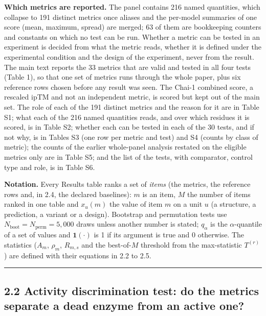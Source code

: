 \documentclass[
  10pt,
]{article}
\DeclareRobustCommand{\_}{\textunderscore\hspace{0pt}}
\begin{document}
\textbf{Which
metrics are
reported.} The panel
contains 216 named
quantities, which
collapse to 191
distinct metrics
once aliases and the
per-model summaries
of one score (mean,
maximum, spread) are
merged; 63 of them
are bookkeeping
counters and
constants on which
no test can be run.
Whether a metric can
be tested in an
experiment is
decided from what
the metric reads,
whether it is
defined under the
experimental
condition and the
design of the
experiment, never
from the result. The
main text reports
the 33 metrics that
are valid and tested
in all four tests
(Table 1), so that
one set of metrics
runs through the
whole paper, plus
six reference rows
chosen before any
result was seen. The
Chai-1 combined
score, a rescaled
ipTM and not an
independent metric,
is scored but kept
out of the main set.
The role of each of
the 191 distinct
metrics and the
reason for it are in
Table S1; what each
of the 216 named
quantities reads,
and over which
residues it is
scored, is in Table
S2; whether each can
be tested in each of
the 30 tests, and if
not why, is in
Tables S3 (one row
per metric and test)
and S4 (counts by
class of metric);
the counts of the
earlier whole-panel
analysis restated on
the eligible metrics
only are in Table
S5; and the list of
the tests, with
comparator, control
type and role, is in
Table S6.

\textbf{Notation.}
Every Results table
ranks a set of
\emph{items} (the
metrics, the
reference rows and,
in 2.4, the declared
baselines): \(m\) is
an item, \(M\) the
number of items
ranked in one table
and \(x_u(m)\) the
value of item \(m\)
on a unit \(u\) (a
structure, a
prediction, a
variant or a
design). Bootstrap
and permutation
tests use
\(N_{\mathrm{boot}} = N_{\mathrm{perm}} = 5{,}000\)
draws unless another
number is stated;
\(q_{\alpha}\) is
the
\(\alpha\)-quantile
of a set of values
and
\(\mathbf{1}(\cdot)\)
is 1 if its argument
is true and 0
otherwise. The
statistics (\(A_m\),
\(\rho_m\),
\(R_{m,s}\) and the
best-of-\(M\)
threshold from the
max-statistic
\(T^{(r)}\)) are
defined with their
equations in 2.2 to
2.5.

\begin{center}\rule{0.5\linewidth}{0.5pt}\end{center}

\subsection{2.2
Activity
discrimination test:
do the metrics
separate a dead
enzyme from an
active one?}
\end{document}

